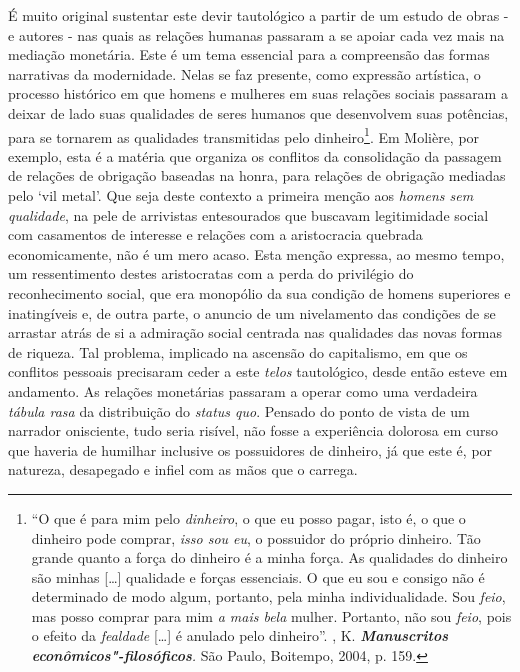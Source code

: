 É muito original sustentar este devir tautológico a partir de um estudo
de obras - e autores - nas quais as relações humanas passaram a se
apoiar cada vez mais na mediação monetária. Este é um tema essencial
para a compreensão das formas narrativas da modernidade. Nelas se faz
presente, como expressão artística, o processo histórico em que homens e
mulheres em suas relações sociais passaram a deixar de lado suas
qualidades de seres humanos que desenvolvem suas potências, para se
tornarem as qualidades transmitidas pelo dinheiro\footnote{``O que é
  para mim pelo \emph{dinheiro}, o que eu posso pagar, isto é, o que o
  dinheiro pode comprar, \emph{isso sou eu}, o possuidor do próprio
  dinheiro. Tão grande quanto a força do dinheiro é a minha força. As
  qualidades do dinheiro são minhas [\ldots{}] qualidade e forças
  essenciais. O que eu sou e consigo não é determinado de modo algum,
  portanto, pela minha individualidade. Sou \emph{feio}, mas posso
  comprar para mim \emph{a mais bela} mulher. Portanto, não sou
  \emph{feio}, pois o efeito da \emph{fealdade} [\ldots{}] é anulado
  pelo dinheiro''. , K. \emph{\textbf{Manuscritos
  econômicos"-filosóficos}.} São Paulo, Boitempo, 2004, p. 159.}. Em
Molière, por exemplo, esta é a matéria que organiza os conflitos da
consolidação da passagem de relações de obrigação baseadas na honra,
para relações de obrigação mediadas pelo `vil metal'. Que seja deste
contexto a primeira menção aos \emph{homens sem qualidade}, na pele de
arrivistas entesourados que buscavam legitimidade social com casamentos
de interesse e relações com a aristocracia quebrada economicamente, não
é um mero acaso. Esta menção expressa, ao mesmo tempo, um ressentimento
destes aristocratas com a perda do privilégio do reconhecimento social,
que era monopólio da sua condição de homens superiores e inatingíveis e,
de outra parte, o anuncio de um nivelamento das condições de se arrastar
atrás de si a admiração social centrada nas qualidades das novas formas
de riqueza. Tal problema, implicado na ascensão do capitalismo, em que
os conflitos pessoais precisaram ceder a este \emph{telos} tautológico,
desde então esteve em andamento. As relações monetárias passaram a
operar como uma verdadeira \emph{tábula rasa} da distribuição do
\emph{status quo}. Pensado do ponto de vista de um narrador onisciente,
tudo seria risível, não fosse a experiência dolorosa em curso que
haveria de humilhar inclusive os possuidores de dinheiro, já que este é,
por natureza, desapegado e infiel com as mãos que o carrega.

